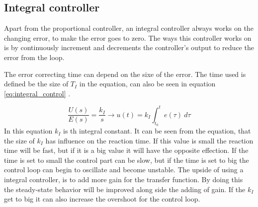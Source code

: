 \subsection*{Integral controller}
Apart from the proportional controller, an integral controller always works on the changing error, to make the error goes to zero. The ways this controller works on is by continuously increment and decrements the controller's output to reduce the error from the loop. 

The error correcting time can depend on the sixe of the error. The time used is defined be the size of $T_I$ in the equation, can also be seen in equation \ref{eq:integral_control} \cite{digital_control}. 

\begin{equation}\label{eq:integral_control}
    \frac{U(s)}{E(s)}=\frac{k_I}{s} \to u(t)=k_I \int_{t_0}^t e(\tau) \ d\tau
\end{equation}
In this equation $k_I$ is th integral constant. It can be seen from the equation, that the size of $k_I$ has influence on the reaction time. If this value is small the reaction time will be fast, but if it is a big value it will have the opposite effection. If the time is set to small the control part can be slow, but if the time is set to big the control loop can begin to oscillate and become unstable. The upside of using a integral controller, is to add more gain for the transfer function. By doing this the steady-state behavior will be improved along side the adding of gain. 
If the $k_I$ get to big it can also increase the overshoot for the control loop\cite{digital_control}. 


